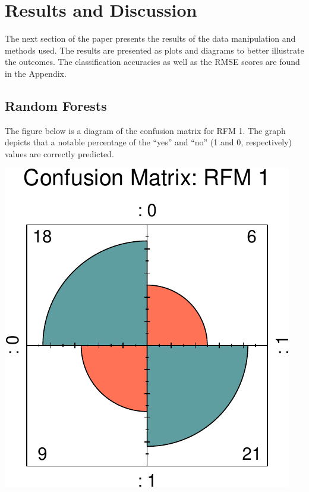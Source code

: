 \documentclass[11pt,preprint, authoryear]{elsarticle}
\numberwithin{equation}{section}
\numberwithin{figure}{section}
\numberwithin{table}{section}
\begin{document}
\hypertarget{results-and-discussion}{%
\section{Results and Discussion}\label{results-and-discussion}}

The next section of the paper presents the results of the data
manipulation and methods used. The results are presented as plots and
diagrams to better illustrate the outcomes. The classification
accuracies as well as the RMSE scores are found in the Appendix.

\hypertarget{random-forests-1}{%
\subsection{Random Forests}\label{random-forests-1}}

The figure below is a diagram of the confusion matrix for RFM 1. The
graph depicts that a notable percentage of the ``yes'' and ``no'' (1 and
0, respectively) values are correctly predicted.

\begin{center}\includegraphics{ML_project_files/figure-latex/unnamed-chunk-8-1} \end{center}
\newpage
\end{document}
